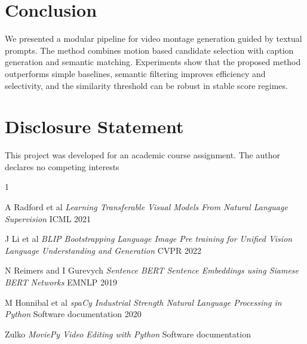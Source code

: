 \documentclass[conference,compsoc]{IEEEtran}
\begin{document}
\FloatBarrier

\section{Conclusion}
We presented a modular pipeline for video montage generation guided by textual prompts. The method combines motion based candidate selection with caption generation and semantic matching. Experiments show that the proposed method outperforms simple baselines, semantic filtering improves efficiency and selectivity, and the similarity threshold can be robust in stable score regimes.

\section*{Disclosure Statement}
This project was developed for an academic course assignment. The author declares no competing interests

\begin{thebibliography}{1}

A Radford et al
\emph{Learning Transferable Visual Models From Natural Language Supervision}
ICML 2021

J Li et al
\emph{BLIP Bootstrapping Language Image Pre training for Unified Vision Language Understanding and Generation}
CVPR 2022

N Reimers and I Gurevych
\emph{Sentence BERT Sentence Embeddings using Siamese BERT Networks}
EMNLP 2019

M Honnibal et al
\emph{spaCy Industrial Strength Natural Language Processing in Python}
Software documentation 2020

Zulko
\emph{MoviePy Video Editing with Python}
Software documentation


\end{thebibliography}
\end{document}
